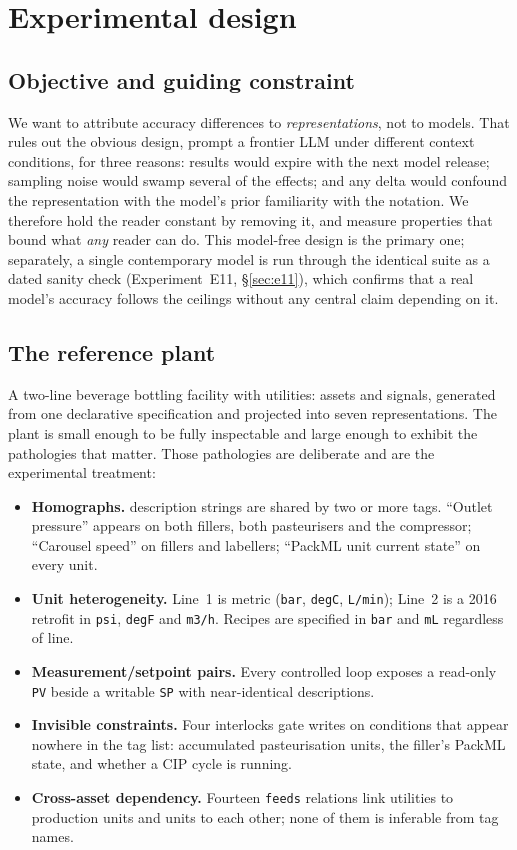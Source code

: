 \section{Experimental design}
\label{sec:design}
\subsection{Objective and guiding constraint}

We want to attribute accuracy differences to \emph{representations}, not to
models. That rules out the obvious design, prompt a frontier LLM under
different context conditions, for three reasons: results would expire with the
next model release; sampling noise would swamp several of the effects; and any
delta would confound the representation with the model's prior familiarity with
the notation. We therefore hold the reader constant by removing it, and measure
properties that bound what \emph{any} reader can do. This model-free design is the
primary one; separately, a single contemporary model is run through the identical
suite as a dated sanity check (Experiment~E11, \S\ref{sec:e11}), which confirms
that a real model's accuracy follows the ceilings without any central claim
depending on it.

\subsection{The reference plant}

A two-line beverage bottling facility with utilities: \NAssets{} assets and
\NSignals{} signals, generated from one declarative specification and projected
into seven representations. The plant is small enough to be fully inspectable and
large enough to exhibit the pathologies that matter. Those pathologies are
deliberate and are the experimental treatment:

\begin{itemize}
  \item \textbf{Homographs.} \NHomographs{} description strings are shared by two
  or more tags. ``Outlet pressure'' appears on both fillers, both pasteurisers
  and the compressor; ``Carousel speed'' on fillers and labellers; ``PackML unit
  current state'' on every unit.
  \item \textbf{Unit heterogeneity.} Line~1 is metric (\texttt{bar},
  \texttt{degC}, \texttt{L/min}); Line~2 is a 2016 retrofit in \texttt{psi},
  \texttt{degF} and \texttt{m3/h}. Recipes are specified in \texttt{bar} and
  \texttt{mL} regardless of line.
  \item \textbf{Measurement/setpoint pairs.} Every controlled loop exposes a
  read-only \texttt{PV} beside a writable \texttt{SP} with near-identical
  descriptions.
  \item \textbf{Invisible constraints.} Four interlocks gate writes on
  conditions that appear nowhere in the tag list: accumulated pasteurisation
  units, the filler's PackML state, and whether a CIP cycle is running.
  \item \textbf{Cross-asset dependency.} Fourteen \texttt{feeds} relations link
  utilities to production units and units to each other; none of them is
  inferable from tag names.
\end{itemize}

